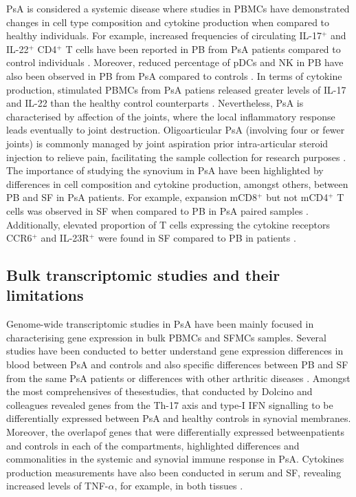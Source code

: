 PsA is considered a systemic disease where studies in PBMCs have demonstrated changes in cell type composition and cytokine production when compared to healthy individuals. For example, increased frequencies of circulating IL-17$^+$ and IL-22$^+$ CD4$^+$ T cells have been reported in PB from PsA patients compared to control individuals \parencite{Benham2013}. Moreover, reduced percentage of pDCs and NK in PB have also been observed in PB from PsA compared to controls \parencite{Jongbloed2008, Spadaro2004}. In terms of cytokine production, stimulated PBMCs from PsA patiens released greater levels of IL-17 and IL-22 than the healthy control counterparts \parencite{Benham2013}. 
Nevertheless, PsA is characterised by affection of the joints, where the local inflammatory response leads eventually to joint destruction. Oligoarticular PsA (involving four or fewer joints) is commonly managed by joint aspiration prior intra-articular steroid injection to relieve pain, facilitating the sample collection for research purposes \parencite{Kavanaugh2006}. The importance of studying the synovium in PsA have been highlighted by differences in cell composition and cytokine production, amongst others, between PB and SF in PsA patients. For example, expansion mCD8$^+$ but not mCD4$^+$ T cells was observed in SF when compared to PB in PsA paired samples \parencite{Ross2000}. Additionally, elevated proportion of T cells expressing the cytokine receptors CCR6$^+$ and IL-23R$^+$ were found in SF compared to PB in patients \parencite{Benham2013}.


\subsection{Bulk transcriptomic studies and their limitations}

Genome-wide transcriptomic studies in PsA have been mainly focused in characterising gene expression in bulk PBMCs and SFMCs samples. Several studies have been conducted to better understand gene expression differences in blood between PsA and controls and also specific differences between PB and SF from the same PsA patients or differences with other arthritic diseases \parencite{Stoeckman2006, Batiwalla2005, Gu2002, Dolcino2015}. Amongst the most comprehensives of thesestudies, that conducted by Dolcino and colleagues revealed genes from the Th-17 axis and type-I IFN signalling to be differentially expressed between PsA and healthy controls in synovial membranes. Moreover, the overlapof genes that were differentially expressed betweenpatients and controls in each of the compartments, highlighted differences and commonalities in the systemic and synovial immune response in PsA. %
Cytokines production measurements have also been conducted in serum and SF, revealing increased levels of TNF-$\alpha$, for example, in both tissues \parencite{Ritchlin1999,Li2017}. 

